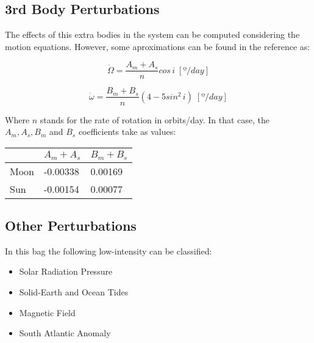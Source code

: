 \subsection{3rd Body Perturbations}
The effects of this extra bodies in the system can be computed considering the motion equations. However, some aproximations can be found in the reference as:

\begin{equation}
\dot{\Omega} = \frac{A_{m}+A_{s}}{n} cos \,i \;[º/day]
\end{equation}

\begin{equation}
\dot{\omega} = \frac{B_{m}+B_{s}}{n} (4 - 5sin^2 \,i)\;[º/day]
\end{equation}

Where $n$ stands for the rate of rotation in orbits/day. In that case, the $A_{m}, A_{s}, B_{m}$ and $B_{s}$ coefficients take as values:

\begin{table}[H]
\centering
\begin{tabular}{l|l|l|}
\cline{2-3}
                           & $A_{m}+A_{s}$ & $B_{m}+B_{s}$ \\ \hline
\multicolumn{1}{|l|}{Moon} & -0.00338      & 0.00169       \\ \hline
\multicolumn{1}{|l|}{Sun}  & -0.00154      & 0.00077       \\ \hline
\end{tabular}
\end{table}

\subsection{Other Perturbations}
In this bag the following low-intensity can be classified:

\begin{itemize}
\item Solar Radiation Pressure
\item Solid-Earth and Ocean Tides
\item Magnetic Field
\item South Atlantic Anomaly
\end{itemize}